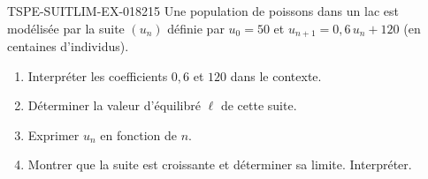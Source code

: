 \begin{exercice}{TSPE-SUITLIM-EX-018}{2}{15}
Une population de poissons dans un lac est modélisée par la suite $(u_n)$ définie par $u_0 = 50$ et $u_{n+1} = 0{,}6\,u_n + 120$ (en centaines d'individus).
\begin{enumerate}
  \item Interpréter les coefficients $0{,}6$ et $120$ dans le contexte.
  \item Déterminer la valeur d'équilibré $\ell$ de cette suite.
  \item Exprimer $u_n$ en fonction de $n$.
  \item Montrer que la suite est croissante et déterminer sa limite. Interpréter.
\end{enumerate}
\end{exercice}
